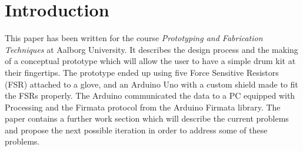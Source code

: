 \section*{Introduction}
\label{Introduktion}
This paper has been written for the course \textit{Prototyping and Fabrication Techniques} at Aalborg University. It describes the design process and the making of a conceptual prototype which will allow the user to have a simple drum kit at their fingertips. The prototype ended up using five Force Sensitive Resistors (FSR) attached to a glove, and an Arduino Uno with a custom shield made to fit the FSRs properly. The Arduino communicated the data to a PC equipped with Processing and the Firmata protocol from the Arduino Firmata library. The paper contains a further work section which will describe the current problems and propose the next possible iteration in order to address some of these problems.